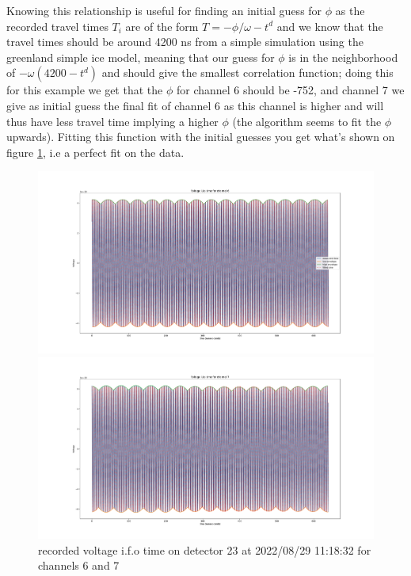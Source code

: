 \documentclass[11pt,a4paper,faculty=we,language=en,doctype=report]{cls/ugent-doc}
\begin{document}
Knowing this relationship is useful for finding an initial guess for $\phi$ as
the recorded travel times $T_i$ are of the form $T = -\phi/\omega - t^d$ and we
know that the travel times should be around 4200 ns from a simple simulation
using the greenland simple ice model, meaning that our guess for $\phi$ is in
the neighborhood of $-\omega(4200-t^d)$ and should give the smallest
correlation function; doing this for this example we get that the $\phi$ for
channel 6 should be -752, and channel 7 we give as initial guess the final fit
of channel 6 as this channel is higher and will thus have less travel time implying a
higher $\phi$ (the algorithm seems to fit the $\phi$ upwards).  Fitting this function
with the initial guesses you get what's shown on figure
\ref{fig:FittedVoltage67}, i.e a perfect fit on the data.
\begin{figure}
	\begin{minipage}{0.49\textwidth}
		\includegraphics[width=\textwidth]{FitChannel6.pdf}
	\end{minipage}
	\begin{minipage}{0.49\textwidth}
		\includegraphics[width=\textwidth]{FitChannel7.pdf}
	\end{minipage}
	\caption{recorded voltage i.f.o time on detector 23 at 2022/08/29 11:18:32 for
	channels 6 and 7}
	\label{fig:FittedVoltage67}
\end{figure}
\end{document}
